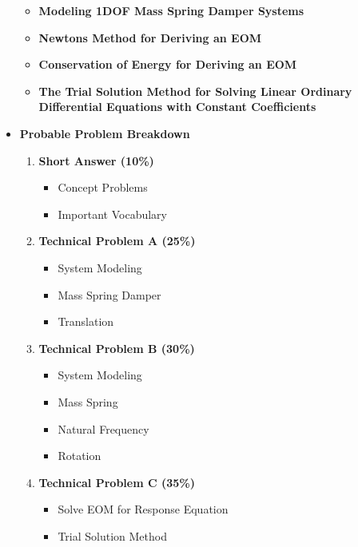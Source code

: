 \documentclass[11pt]{article}
\begin{document}
\begin{itemize}
\begin{itemize}
		\item  \textbf{\Large Modeling 1DOF Mass Spring Damper Systems}\\
		\item  \textbf{\Large Newtons Method for Deriving an EOM}\\
		\item  \textbf{\Large Conservation of Energy for Deriving an EOM}\\
		\item  \textbf{\Large The Trial Solution Method for Solving Linear Ordinary \\Differential Equations with Constant Coefficients}\\
		
	\end{itemize}

\newpage
\item  \textbf{\Large Probable Problem Breakdown}\\
\Large
	\begin{enumerate}


		\item  \textbf{\Large Short Answer (10\%)} \\
		\begin{itemize}
			\item Concept Problems
			\item Important Vocabulary \\
		\end{itemize}
		\item  \textbf{\Large Technical Problem A (25\%)}\\
		\begin{itemize}
			\item System Modeling
			\item Mass Spring Damper
			\item Translation \\
		\end{itemize}
		\item  \textbf{\Large Technical Problem B (30\%)}\\
		\begin{itemize}
			\item System Modeling
			\item Mass Spring
			\item Natural Frequency	
			\item Rotation \\
		\end{itemize}
		\item  \textbf{\Large Technical Problem C (35\%)}\\
\begin{itemize}
			\item Solve EOM for Response Equation
			\item Trial Solution Method\\
\end{itemize}
	\end{enumerate}


\end{itemize}


	
\end{document}
